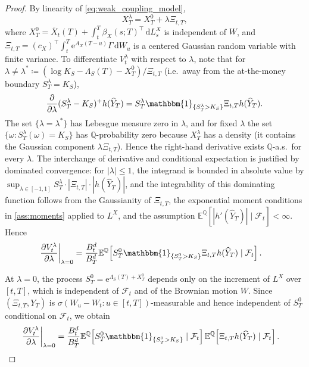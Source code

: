 \documentclass[10pt,a4paper,reqno]{amsart}
\newcommand{\E}{\mathbb{E}}
\newcommand{\Q}{\mathbb{Q}}
\newcommand{\F}{\mathcal{F}}
\newcommand{\1}{\mathbbm{1}}
\newcommand{\dd}{\mathrm{d}}
\newcommand{\ee}{\mathrm{e}}
\begin{document}
\begin{proof}
By linearity of \eqref{eq:weak_coupling_model},
$$
X_T^\lambda = X_T^0 + \lambda \Xi_{t,T},
$$
where $X_T^0 = \overline{X}_t(T) + \int_t^T \beta_X(s;T)^\top\,\dd
L_s^X$ is independent of $W$, and $\Xi_{t,T} = (c_X)^\top\int_t^T
\ee^{A_X(T-u)}\Gamma\,\dd W_u$ is a centered Gaussian random variable with
finite variance. To differentiate $V_t^\lambda$ with respect to
$\lambda$, note that for $\lambda \neq \lambda^* \coloneqq
(\log K_S - \Lambda_S(T) - X_T^0)/\Xi_{t,T}$ (i.e.\ away from the
at-the-money boundary $S_T^\lambda = K_S$),
$$
\frac{\partial}{\partial\lambda}(S_T^\lambda - K_S)^+ h(\widehat{Y}_T)
= S_T^\lambda \1_{\{S_T^\lambda>K_S\}} \Xi_{t,T} h(\widehat{Y}_T).
$$
The set $\{\lambda = \lambda^*\}$ has Lebesgue measure zero in $\lambda$,
and for fixed $\lambda$ the set $\{\omega: S_T^\lambda(\omega) = K_S\}$
has $\Q$-probability zero because $X_T^\lambda$ has a density
(it contains the Gaussian component $\lambda\Xi_{t,T}$). Hence the
right-hand derivative exists $\Q$-a.s.\ for every $\lambda$.
The interchange of derivative and conditional expectation is justified by
dominated convergence: for $|\lambda| \le 1$, the integrand is bounded in
absolute value by
$\sup_{\lambda\in[-1,1]}S_T^\lambda\cdot|\Xi_{t,T}|\cdot|h(\widehat{Y}_T)|$, and the
integrability of this dominating function follows from the Gaussianity of
$\Xi_{t,T}$, the exponential moment conditions in
\ref{ass:moments} applied to $L^X$, and the
assumption $\E^\Q[|h'(\widehat{Y}_T)|\mid\F_t]<\infty$.
Hence
\begin{align*}
  \left.\frac{\partial V_t^\lambda}{\partial \lambda}\right|_{\lambda=0}
  &= \frac{B_t^d}{B_T^d}
     \E^\Q\!\left[
       S_T^0 \1_{\{S_T^0>K_S\}} \Xi_{t,T} h(\widehat{Y}_T)
       \mid \F_t
     \right].
\end{align*}

At $\lambda=0$, the process $S_T^0 = \ee^{\Lambda_S(T)+X_T^0}$ depends
only on the increment of $L^X$ over $[t,T]$, which is independent of
$\F_t$ and of the Brownian motion $W$. Since $(\Xi_{t,T},Y_T)$ is
$\sigma(W_u-W_t : u \in [t,T])$-measurable and hence independent of
$S_T^0$ conditional on $\F_t$, we obtain
\begin{align*}
  \left.\frac{\partial V_t^\lambda}{\partial \lambda}\right|_{\lambda=0}
  &= \frac{B_t^d}{B_T^d}
     \E^\Q\!\left[S_T^0 \1_{\{S_T^0>K_S\}}\mid\F_t\right]
     \E^\Q\!\left[\Xi_{t,T} h(\widehat{Y}_T)\mid\F_t\right].
\end{align*}


\end{proof}
\end{document}
